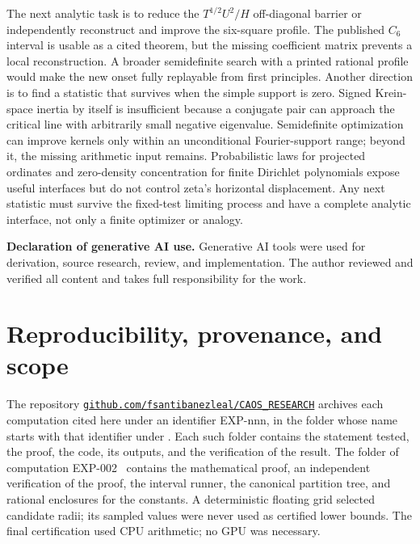 ﻿\documentclass[11pt]{article}
\theoremstyle{remark}
\begin{document}
The next analytic task is to reduce the $T^{1/2}U^2/H$ off-diagonal barrier or
independently reconstruct and improve the six-square profile. The published
$C_6$ interval is usable as a cited theorem, but the missing coefficient matrix
prevents a local reconstruction. A broader semidefinite search with a printed
rational profile would make the new onset fully replayable from first
principles. Another direction is to find a statistic that survives when the
simple support is zero.
Signed Krein-space inertia by itself is insufficient because a conjugate pair
can approach the critical line with arbitrarily small negative eigenvalue.
Semidefinite optimization can improve kernels only within an unconditional
Fourier-support range; beyond it, the missing arithmetic input remains.
Probabilistic laws for projected ordinates and zero-density concentration for
finite Dirichlet polynomials expose useful interfaces but do not control zeta's
horizontal displacement. Any next statistic must survive the fixed-test
limiting process and have a complete analytic interface, not only a finite
optimizer or analogy.

\medskip
\noindent\textbf{Declaration of generative AI use.} Generative AI tools
were used for derivation, source research, review, and implementation.
The author reviewed and verified all content and takes full
responsibility for the work.

\appendix
\section{Reproducibility, provenance, and scope}

The repository
\href{https://github.com/fsantibanezleal/CAOS_RESEARCH}{\nolinkurl{github.com/fsantibanezleal/CAOS_RESEARCH}}
archives each computation cited here under an identifier EXP-nnn, in the
folder whose name starts with that identifier under
. Each such
folder contains the statement tested, the proof, the code, its outputs,
and the verification of the result. The folder of computation
EXP-002~\cite{Record} contains the mathematical proof, an independent
verification of the proof, the interval runner, the canonical partition
tree, and rational enclosures for the constants. A
deterministic floating grid selected candidate radii; its sampled values
were never used as certified lower bounds. The final certification used
CPU arithmetic; no GPU was necessary.
\end{document}
